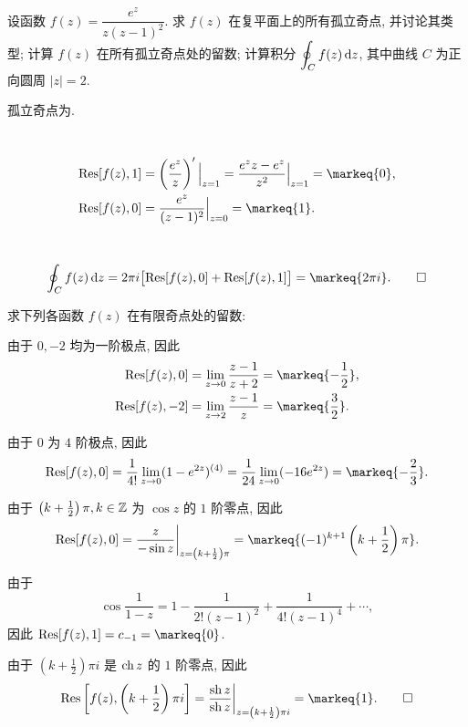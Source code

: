 \begin{exercise}
	设函数 $f(z)=\dfrac{e^z}{z(z-1)^2}$.
	\subex 求 $f(z)$ 在复平面上的所有孤立奇点, 并讨论其类型;
	\subex 计算 $f(z)$ 在所有孤立奇点处的留数;
	\subex 计算积分 $\displaystyle\oint_Cf(z)\,\mathrm{d} z$, 其中曲线 $C$ 为正向圆周 $|z|=2$.
\end{exercise}
\begin{solution}
	\subex 孤立奇点为.

	\subex~
	\begin{align*}
		\Res[f(z),1]&=\left(\frac{e^z}{z}\right)'\Big|_{z=1}
		=\frac{e^z z-e^z}{z^2}\Big|_{z=1}=\markeq{0},\\
		\Res[f(z),0]&=\frac{e^z}{(z-1)^2}\Big|_{z=0}=\markeq{1}.
	\end{align*}

	\subex~
	\[\oint_Cf(z)\diff z=2\pi i\bigl[\Res[f(z),0]+\Res[f(z),1]\bigr]=\markeq{2\pi i}.\qedhere\]
\end{solution}


\begin{exercise}[5]
	求下列各函数 $f(z)$ 在有限奇点处的留数:
\end{exercise}
\begin{solution}
	\subex 由于 $0,-2$ 均为一阶极点, 因此
	\begin{align*}
	\Res[f(z),0]&=\lim_{z\to 0}\frac{z-1}{z+2}=\markeq{-\frac12},\\
	\Res[f(z),-2]&=\lim_{z\to 2}\frac{z-1}z=\markeq{\frac32}.
	\end{align*}

	\subex 由于 $0$ 为 $4$ 阶极点, 因此
	\[\Res[f(z),0]=\frac1{4!}\lim_{z\to 0}(1-e^{2z})^{(4)}
	=\frac1{24}\lim_{z\to 0}(-16e^{2z})=\markeq{-\frac23}.\]

	\subex 由于 $\left(k+\frac12\right)\pi, k\in{\mathbb{Z}}$ 为 $\cos z$ 的 $1$ 阶零点, 因此
	\[\Res[f(z),0]=\frac{z}{-\sin z}\bigg|_{z=\left(k+\frac12\right)\pi}=\markeq{(-1)^{k+1}\left(k+\frac12\right)\pi}.\]

	\subex 由于
	\[\cos\frac1{1-z}=1-\frac1{2!(z-1)^2}+\frac1{4!(z-1)^4}+\cdots,\]
	因此 $\Res[f(z),1]=c_{-1}=\markeq{0}$.

	\subex 由于 $\left(k+\frac12\right)\pi i$ 是 $\operatorname{ch} z$ 的 $1$ 阶零点, 因此
	\[\Res\left[f(z),\left(k+\frac12\right)\pi i\right]
	=\frac{\sh z}{\sh z}\bigg|_{z=\left(k+\frac12\right)\pi i}=\markeq{1}.\qedhere\]
\end{solution}


